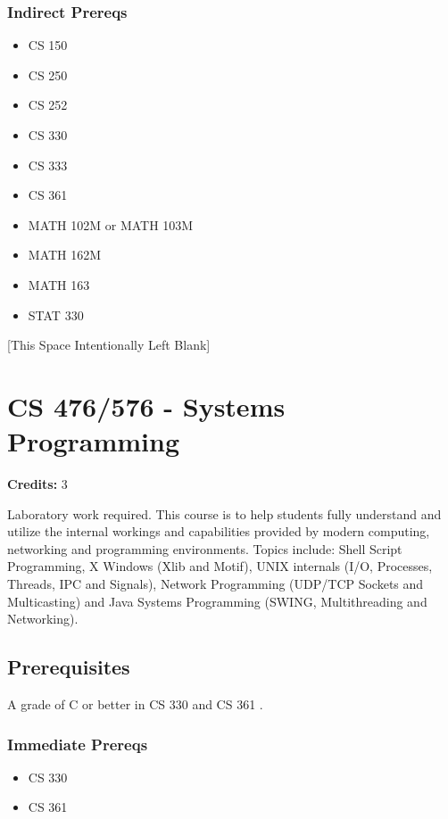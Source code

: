 \documentclass[]{article}
\providecommand{\tightlist}{%
  \setlength{\itemsep}{0pt}\setlength{\parskip}{0pt}}
\newcommand{\pagebreakhere}{
\vspace*{\fill}
\begin{center}
[This Space Intentionally Left Blank]
\end{center}
\vspace*{\fill}
\newpage
}
\begin{document}
\subsubsection{Indirect Prereqs}\label{indirect-prereqs-36}

\begin{itemize}
\tightlist
\item
  CS 150
\item
  CS 250
\item
  CS 252
\item
  CS 330
\item
  CS 333
\item
  CS 361
\item
  MATH 102M or MATH 103M
\item
  MATH 162M
\item
  MATH 163
\item
  STAT 330
\end{itemize}

\pagebreakhere
\section{CS 476/576 - Systems
Programming}\label{cs-476576---systems-programming}

\textbf{Credits:} 3

Laboratory work required. This course is to help students fully
understand and utilize the internal workings and capabilities provided
by modern computing, networking and programming environments. Topics
include: Shell Script Programming, X Windows (Xlib and Motif), UNIX
internals (I/O, Processes, Threads, IPC and Signals), Network
Programming (UDP/TCP Sockets and Multicasting) and Java Systems
Programming (SWING, Multithreading and Networking).

\subsection{Prerequisites}\label{prerequisites-46}

A grade of C or better in CS 330 and CS 361 .

\subsubsection{Immediate Prereqs}\label{immediate-prereqs-37}

\begin{itemize}
\tightlist
\item
  CS 330
\item
  CS 361
\end{itemize}
\end{document}
